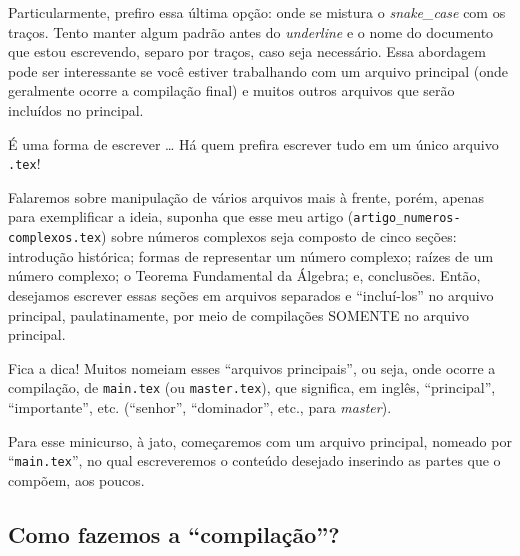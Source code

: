 Particularmente, prefiro essa última opção: onde se mistura o \textit{snake\_case}
com os traços.
Tento manter algum padrão antes do \textit{underline} e o nome do documento que 
estou escrevendo, separo por traços, caso seja necessário.
Essa abordagem pode ser interessante se você estiver trabalhando com um arquivo
principal (onde geralmente ocorre a compilação final) e muitos outros arquivos 
que serão incluídos no principal.

É uma forma de escrever \ldots
Há quem prefira escrever tudo em um único arquivo \texttt{.tex}!

Falaremos sobre manipulação de vários arquivos mais à frente, porém, apenas para
exemplificar a ideia, suponha que esse meu artigo (\texttt{artigo\_numeros-complexos.tex}) 
sobre números complexos seja composto de cinco seções:
introdução histórica; formas de representar um número complexo; raízes de um 
número complexo; o Teorema Fundamental da Álgebra; e, conclusões.
Então, desejamos escrever essas seções em arquivos separados e ``incluí-los'' no
arquivo principal, paulatinamente, por meio de compilações SOMENTE no arquivo
principal.

\begin{atencao}{Fica a dica!}{\exclamacao}
  Muitos nomeiam esses ``arquivos principais'', ou seja, onde ocorre a compilação, 
  de \texttt{main.tex} (ou \texttt{master.tex}), que significa, em inglês, 
  ``principal'', ``importante'', etc. (``senhor'', ``dominador'', etc., para \textit{master}).
\end{atencao}

Para esse minicurso, à jato, começaremos com um arquivo principal, nomeado por
``\texttt{main.tex}'', no qual escreveremos o conteúdo desejado inserindo as partes 
que o compõem, aos poucos.

\subsection{Como fazemos a ``compilação''?} %

